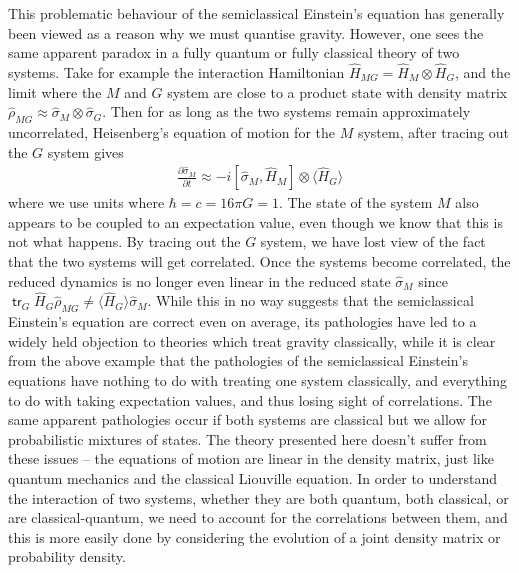 \documentclass[aps,pra,showpacs,citeautoscript,amsmath,amssymb,floatfix,superscriptaddress,bbm, verbatim,amsfonts,changes,10pt,nofootinbib,longbibliography]{revtex4-1}
\newcommand{\tr}{\mathop{\mathsf{tr}}\nolimits}
\begin{document}
This problematic behaviour of the semiclassical Einstein's equation has generally been viewed as a reason why we must quantise gravity\cite{dewitt1953new,duff1980inconsistency,unruh1984steps,carlip2008quantum}. However, one sees the same apparent paradox in a fully quantum or fully classical theory of two systems. Take for example the interaction Hamiltonian $\hat{H}_{MG}=\hat{H}_M\otimes \hat{H}_G$, and the limit where the $M$ and $G$ system are close to a product state with density matrix $\hat{\rho}_{MG}\approx\hat{\sigma}_M\otimes\hat{\sigma}_G$.
Then for as long as the two systems remain approximately uncorrelated, Heisenberg's equation of motion for the $M$ system, after tracing out the $G$ system gives
\begin{align}
\frac{\partial \hat{\sigma}_M}{\partial t}\approx -i[\hat{\sigma}_M,\hat{H}_M]\otimes\langle \hat{H}_G \rangle
\label{eq:homer-semi}
\end{align}
where we use units where $\hbar=c=16\pi G=1$.
The state of the system $M$ also appears to be coupled to an expectation value, even though we know that this is not what happens. By tracing out the $G$ system, we have lost view of the fact that the two systems will get correlated. Once the systems become correlated, the reduced dynamics is no longer even linear in the reduced state $\hat{\sigma}_M$ since $\tr_G \hat{H}_G\hat{\rho}_{MG}\neq \langle \hat{H}_G\rangle\hat{\sigma}_M$. 
While this in no way suggests that the semiclassical Einstein's equation are correct even on average, its pathologies have led to a widely held objection to theories which treat gravity classically, while it is clear from the above example that the pathologies of the semiclassical Einstein's equations have nothing to do with treating one system classically, and everything to do with taking expectation values, and thus losing sight of correlations. The same apparent pathologies occur if both systems are classical but we allow for probabilistic mixtures of states. The theory presented here doesn't suffer from these issues -- the equations of motion are linear in the density matrix, just like quantum mechanics and the classical Liouville equation.  In order to understand the interaction of two systems, whether they are both quantum, both classical, or are classical-quantum, we need to account for the correlations between them, and this is more easily done by considering the evolution of a joint density matrix or probability density.
\end{document}
